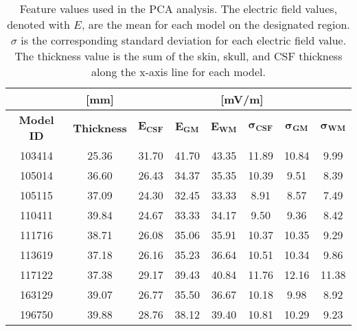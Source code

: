 \begin{table}[!ht]
	\centering
    \caption[\gls{PCA} feature values]{Feature values used in the \gls{PCA} analysis. The electric field values, denoted with $E$, are the mean for each model on the designated region. $\sigma$ is the corresponding standard deviation for each electric field value. The thickness value is the sum of the skin, skull, and \gls{CSF} thickness along the x-axis line for each model.}
    \label{tab:pca_features}
    \begin{tabular}{|c|c|c|c|c|c|c|c|}
        \cline{2-8}
        \multicolumn{1}{c|}{} & \cellcolor[HTML]{C0C0C0}\textbf{[mm]} & \multicolumn{6}{c|}{\cellcolor[HTML]{C0C0C0}\textbf{[mV/m]}} \\ \hline
        \rowcolor[HTML]{C0C0C0} 
        \textbf{Model ID} & \textbf{Thickness} &  $\boldsymbol{E_{CSF}}$ & $\boldsymbol{E_{GM}}$ & $\boldsymbol{E_{WM}}$ & $\boldsymbol{\sigma_{CSF}}$ & $\boldsymbol{\sigma_{GM}}$ & $\boldsymbol{\sigma_{WM}}$ \\\hline
        103414 & 25.36 &             31.70 &            41.70 &            43.35 &            11.89 &           10.84 &            9.99 \\\hline
        105014 & 36.60 &             26.43 &            34.37 &            35.35 &            10.39 &            9.51 &            8.39 \\\hline
        105115 & 37.09 &             24.30 &            32.45 &            33.33 &             8.91 &            8.57 &            7.49 \\\hline
        110411 & 39.84 &             24.67 &            33.33 &            34.17 &             9.50 &            9.36 &            8.42 \\\hline
        111716 & 38.71 &             26.08 &            35.06 &            35.91 &            10.37 &           10.35 &            9.29 \\\hline
        113619 & 37.18 &             26.16 &            35.23 &            36.64 &            10.51 &           10.34 &            9.86 \\\hline
        117122 & 37.38 &             29.17 &            39.43 &            40.84 &            11.76 &           12.16 &           11.38 \\\hline
        163129 & 39.07 &             26.77 &            35.50 &            36.67 &            10.18 &            9.98 &            8.92 \\\hline
        196750 & 39.88 &             28.76 &            38.12 &            39.40 &            10.81 &           10.29 &            9.23 \\\hline
    \end{tabular}
\end{table}

